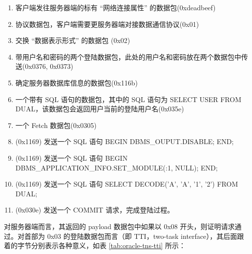 \begin{enumerate}
    \item 客户端发往服务器端的标有 ``网络连接属性'' 的数据包({\cf 0xdeadbeef})
    \item 协议数据包，客户端需要更服务器端对接数据通信协议({\cf 0x01})
    \item 交换 ``数据表示形式'' 的数据包 ({\cf 0x02})
    \item 带用户名和密码的两个登陆数据包，此处的用户名和密码放在两个数据包中传送({\cf 0x0376, 0x0373})
    \item 确定服务器数据库信息的数据包({\cf 0x116b})
    \item 一个带有 SQL 语句的数据包，其中的 SQL 语句为 {\cf SELECT USER FROM DUAL}，该数据包会返回用户当前的登陆用户名({\cf 0x035e}) 
    \item 一个 Fetch 数据包({\cf 0x0305}) 
    \item ({\cf 0x1169}) 发送一个 SQL 语句 {\cf BEGIN DBMS\_OUPUT.DISABLE; END;}
    \item ({\cf 0x1169}) 发送一个 SQL 语句 {\cf BEGIN DBMS\_APPLICATION\_INFO.SET\_MODULE(:1, NULL); END;}
    \item ({\cf 0x1169}) 发送一个 SQL 语句 {\cf SELECT DECODE('A', 'A', '1', '2') FROM DUAL;}
    \item ({\cf 0x030e}) 发送一个 COMMIT 请求，完成登陆过程。
\end{enumerate}

对服务器端而言，其返回的 payload 数据包中如果以 {\cf 0x08} 开头，则证明请求通过。对首部为 {\cf 0x03} 的登陆数据包而言（即 TTI，{\ef two-task interface}），其后面跟着的字节分别表示各种意义，如表 \ref{tab:oracle-tns-tti} 所示：

